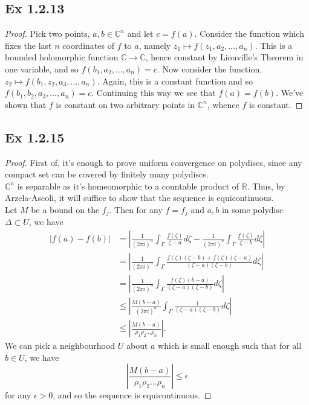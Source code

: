 \documentclass{article}
\theoremstyle{definition}
\newcommand{\R}{\mathbb{R}}
\newcommand{\C}{\mathbb{C}}
\begin{document}
\subsection*{Ex 1.2.13}

\begin{proof}
	Pick two points, $a, b \in \C^{n}$ and let $c = f(a)$. Consider the
	function which fixes the last $n$ coordinates of $f$ to $a$, namely $z_1
	\mapsto f(z_1, a_2, \ldots, a_n)$. This is a bounded holomorphic function
	$\C \to \C$, hence constant by Liouville's Theorem in one variable, and so
	$f(b_1, a_2, \ldots, a_n) = c$. Now consider the function, $z_2 \mapsto
	f(b_1, z_2, a_3, \ldots, a_n)$. Again, this is a constant function and so
	$f(b_1,b_2,a_3,\ldots,a_n) = c$. Continuing this way we see that $f(a) =
	f(b)$. We've shown that $f$ is constant on two arbitrary points in
	$\C^{n}$, whence $f$ is constant.
\end{proof}

\subsection*{Ex 1.2.15}

\begin{proof}
	First of, it's enough to prove uniform convergence on polydiscs, since any
	compact set can be covered by finitely many polydiscs. \\

	$\C^{n}$ is separable as it's homeomorphic to a countable product of $\R$.
	Thus, by Arzela-Ascoli, it will suffice to show that the sequence is
	equicontinuous. \\

	Let $M$ be a bound on the $f_j$. Then for any $f = f_j$ and $a, b$ in some
	polydisc $\Delta \subset U$, we have
	\begin{align*}
		\left|
		f(a) - f(b)
		\right|
		&=
		\left|
		\frac{1}{(2\pi i)^{n}}
		\int_{\Gamma}
		\frac{f(\zeta)}{\zeta - a}
		d\zeta
		-
		\frac{1}{(2\pi i)^{n}}
		\int_{\Gamma}
		\frac{f(\zeta)}{\zeta - b}
		d\zeta
		\right| \\
		&=
		\left|
		\frac{1}{(2\pi i)^{n}}
		\int_{\Gamma}
		\frac{f(\zeta)(\zeta - b) + f(\zeta)(\zeta - a)}{(\zeta - a)(\zeta - b)}
		d\zeta
		\right| \\
		&=
		\left|
		\frac{1}{(2\pi i)^{n}}
		\int_{\Gamma}
		\frac{f(\zeta)(b - a)}{(\zeta - a)(\zeta - b)}
		d\zeta
		\right| \\
		&\leq
		\left|
		\frac{M(b - a)}{(2\pi i)^{n}}
		\int_{\Gamma}
		\frac{1}{(\zeta - a)(\zeta - b)}
		d\zeta
		\right| \\
		&\leq
		\left|
		\frac{M(b - a)}{\rho_1\rho_2\ldots \rho_n}
		\right|.
	\end{align*} 
	We can pick a neighbourhood $U$ about $a$ which is small enough such that
	for all $b \in U$, we have
	\[
		\left|
		\frac{M(b - a)}{\rho_1\rho_2\ldots \rho_n}
		\right|
		\leq \epsilon
	\] 
	for any $\epsilon > 0$, and so the sequence is equicontinuous.
\end{proof}
\end{document}
